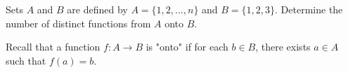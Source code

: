 Sets $A$ and $B$ are defined by $A = \lbrace 1, 2, ..., n \rbrace$ and
$B = \lbrace 1, 2, 3 \rbrace$. Determine the number of distinct functions from
$A$ onto $B$.

Recall that a function $f : A \rightarrow B$ is "onto" if for each $b \in B$,
there exists $a \in A$ such that $f(a) = b$.
